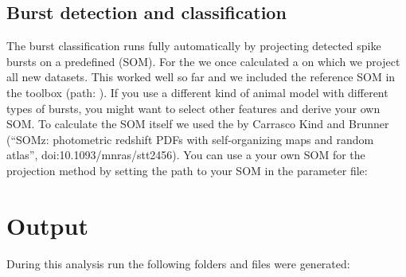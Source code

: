 \documentclass[letterpaper,10pt,english]{sphinxmanual}
\let\sphinxpxdimen\pdfpxdimen\else\newdimen\sphinxpxdimen
\begin{document}
\section{Burst detection and classification}
\label{\detokenize{LFP_to_bursts:burst-detection-and-classification}}\label{\detokenize{LFP_to_bursts:burst-classification}}
The burst classification runs fully automatically by projecting detected spike bursts on a predefined  (SOM). For the  we once calculated a  on which we project all new datasets. This worked well so far and we included the reference SOM in
the toolbox (path: ).
If you use a different kind of animal model with different types of bursts, you might want to select other features and derive your own SOM.
To calculate the SOM itself we used the  by
Carrasco Kind and Brunner (“SOMz: photometric redshift PDFs with self-organizing maps and random atlas”, doi:10.1093/mnras/stt2456).
You can use a your own SOM for the projection method by setting the path to your SOM in the parameter file:

\noindent{\hspace*{\fill}\sphinxincludegraphics[width=500\sphinxpxdimen]{{SOM_path}.png}\hspace*{\fill}}


\chapter{Output}
\label{\detokenize{output:output}}\label{\detokenize{output:id1}}\label{\detokenize{output::doc}}
During this analysis run the following folders and files were generated:
\end{document}

